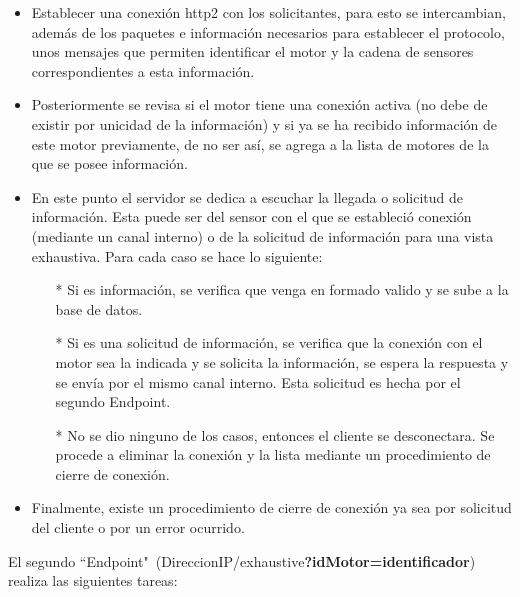     \begin{itemize}
        \item Establecer una conexión http2 con los solicitantes, para esto se intercambian,
            además de los paquetes e información necesarios para establecer el protocolo,
            unos mensajes que permiten identificar el motor y la cadena de sensores
            correspondientes a esta información.
        \item Posteriormente se revisa si el motor
            tiene una conexión activa (no debe de existir por unicidad de la información)
            y si ya se ha recibido información de este motor previamente, de no ser así,
            se agrega a la lista de motores de la que se posee información.
        \item En este punto el servidor se dedica a escuchar la llegada o solicitud
            de información. Esta puede ser del sensor con el que se estableció
            conexión (mediante un canal interno) o  de la solicitud de información
            para una vista exhaustiva. Para cada caso se hace lo siguiente:
            \begin{itemize}
                \item[*] Si es información, se verifica que venga en formado valido
                    y se sube a la base de datos.
                \item[*] Si es una solicitud de información, se verifica que
                    la conexión con el motor sea la indicada y se solicita la
                    información, se espera la respuesta y se envía por el mismo
                    canal interno. Esta solicitud es hecha por el segundo Endpoint.
                \item[*] No se dio ninguno de los casos, entonces el cliente se
                    desconectara. Se procede a eliminar la conexión y la lista
                    mediante un procedimiento de cierre de conexión.
            \end{itemize}
        \item Finalmente, existe un procedimiento de cierre de conexión ya sea
            por solicitud del cliente o por un error ocurrido.
    \end{itemize}


    El segundo ``Endpoint"\ (DireccionIP/exhaustive\textbf{?idMotor=identificador})
    realiza las siguientes tareas:

